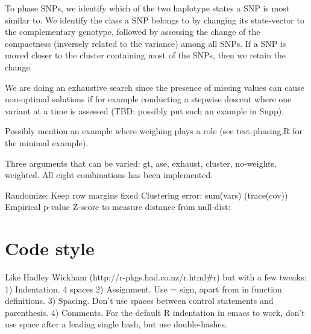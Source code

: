 To phase SNPs, we identify which of the two haplotype states a SNP is most similar to. We identify the class a SNP belongs to by changing its state-vector to the complementary genotype, followed by assessing the change of the compactness (inversely related to the variance) among all SNPs. If a SNP is moved closer to the cluster containing most of the SNPs, then we retain the change. 

We are doing an exhaustive search since the presence of missing values
can cause non-optimal solutions if for example conducting a stepwise
descent where one variant at a time is assessed (TBD: possibly put
such an example in Supp).

Possibly mention an example where weighing plays a role (see
test-phasing.R for the minimal example).

Three arguments that can be varied: {gt, ase}, {exhaust, cluster},
{no-weights, weighted}. All eight combinations has been implemented.

Randomize: Keep row margins fixed
Clustering error: sum(vars) (trace(cov))
Empirical p-value
Z-score to measure distance from null-dist: %

\section{Code style}
Like Hadley Wickham (http://r-pkgs.had.co.nz/r.html#r) but with a few tweaks:
1) Indentation. 4 spaces
2) Assignment. Use = sign, apart from in function definitions.
3) Spacing. Don't use spaces between control statements and parenthesis.
4) Comments. For the default R indentation in emacs to work, don't use space
after a leading single hash, but use double-hashes.